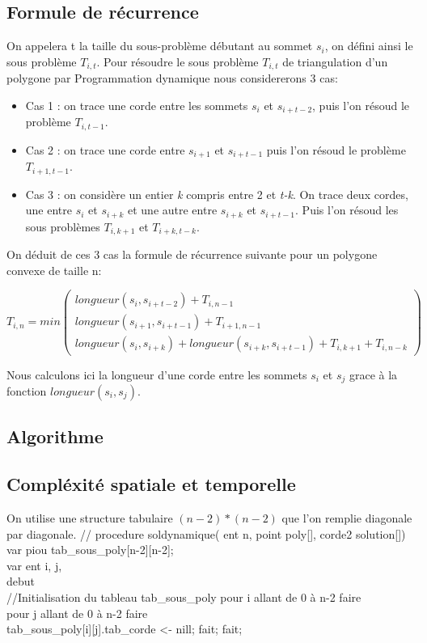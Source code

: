 \documentclass[a4paper,10pt]{article}
\begin{document}
\subsection{Formule de récurrence}



On appelera t la taille du sous-problème débutant au sommet \(s_i\), on défini ainsi le sous problème \(T_{i,t}\).
Pour résoudre le sous problème \(T_{i,t}\) de triangulation d'un polygone par Programmation dynamique nous considererons 3 cas:

\begin{itemize}
 \item Cas 1 : on trace une corde entre les sommets \(s_i\) et \(s_{i+t-2}\), puis l'on résoud le problème \(T_{i,t-1}\).
 \item Cas 2 : on trace une corde entre \(s_{i+1}\) et \(s_{i+t-1}\) puis l'on résoud le problème \(T_{i+1,t-1}\).
 \item Cas 3 : on considère un entier \emph{k} compris entre 2 et \emph{t-k}. On trace deux cordes, une entre \(s_{i}\) et \(s_{i+k}\) et une autre entre \(s_{i+k}\) et \(s_{i+t-1}\).
 Puis l'on résoud les sous problèmes \(T_{i,k+1}\) et \(T_{i+k,t-k}\).
\end{itemize}

On déduit de ces 3 cas la formule de récurrence suivante pour un polygone convexe de taille n: 

\begin{equation} 
T_{i,n} = min 
\begin{pmatrix} 
 longueur(s_i, s_{i+t-2}) + T_{i,n-1} \\
  longueur(s_{i+1}, s_{i+t-1}) + T_{i+1,n-1} \\
  longueur(s_i, s_{i+k}) + longueur(s_{i+k}, s_{i+t-1}) + T_{i,k+1} + T_{i,n-k}
\end{pmatrix}               
\end{equation}

Nous calculons ici la longueur d'une corde entre les sommets \(s_i\) et \(s_j\) grace à la fonction \( longueur(s_i, s_j) \). 

\subsection{Algorithme}

 
 
\subsection{Compléxité spatiale et temporelle}
On utilise une structure tabulaire \((n-2)*(n-2)\) que l'on remplie diagonale par diagonale.
//
procedure soldynamique( ent n, point poly[], corde2 solution[])
var piou tab_sous_poly[n-2][n-2]; \\
var ent i, j, \\
debut \\
  //Initialisation du tableau tab_sous_poly
  pour i allant de 0 à n-2 faire \\
  pour j allant de 0 à n-2 faire \\
  tab_sous_poly[i][j].tab_corde <- nill;
  fait;
  fait;
 
\end{document}
